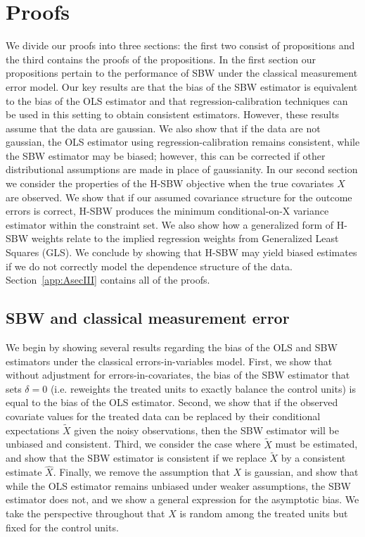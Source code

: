\section{Proofs}\label{ssec:proof}

We divide our proofs into three sections: the first two consist of propositions and the third contains the proofs of the propositions. In the first section our propositions pertain to the performance of SBW under the classical measurement error model. Our key results are that the bias of the SBW estimator is equivalent to the bias of the OLS estimator and that regression-calibration techniques can be used in this setting to obtain consistent estimators. However, these results assume that the data are gaussian. We also show that if the data are not gaussian, the OLS estimator using regression-calibration remains consistent, while the SBW estimator may be biased; however, this can be corrected if other distributional assumptions are made in place of gaussianity. In our second section we consider the properties of the H-SBW objective when the true covariates $X$ are observed. We show that if our assumed covariance structure for the outcome errors is correct, H-SBW produces the minimum conditional-on-X variance estimator within the constraint set. We also show how a generalized form of H-SBW weights relate to the implied regression weights from Generalized Least Squares (GLS). We conclude by showing that H-SBW may yield biased estimates if we do not correctly model the dependence structure of the data. Section~\ref{app:AsecIII} contains all of the proofs.

\subsection{SBW and classical measurement error}\label{app:AsecI}

We begin by showing several results regarding the bias of the OLS and SBW estimators under the classical errors-in-variables model. First, we show that without adjustment for errors-in-covariates, the bias of the SBW estimator that sets $\delta = 0$ (i.e. reweights the treated units to exactly balance the control units) is equal to the bias of the OLS estimator. Second, we show that if the observed covariate values for the treated data can be replaced by their conditional expectations $\tilde{X}$ given the noisy observations, then the SBW estimator will be unbiased and consistent. Third, we consider the case where $\tilde{X}$ must be estimated, and show that the SBW estimator is consistent if we replace $\tilde{X}$ by a consistent estimate $\hat{X}$. Finally, we remove the assumption that $X$ is gaussian, and show that while the OLS estimator remains unbiased under weaker assumptions, the SBW estimator does not, and we show a general expression for the asymptotic bias. We take the perspective throughout that $X$ is random among the treated units but fixed for the control units.

